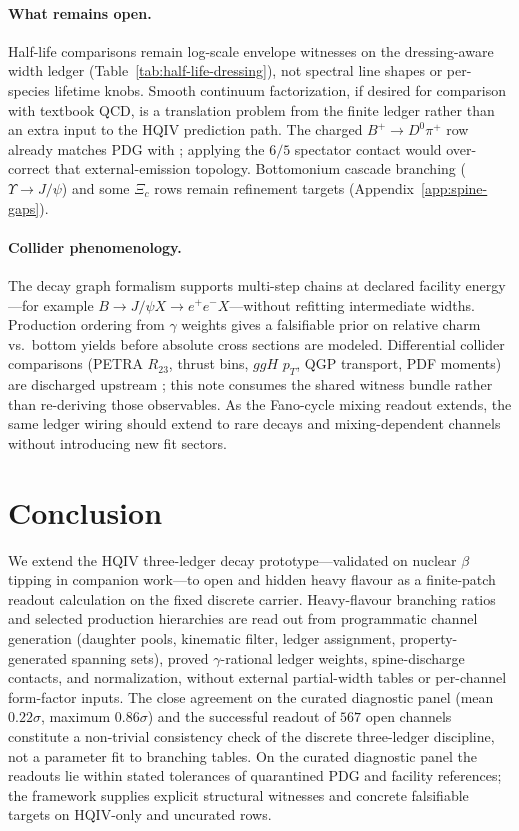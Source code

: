 \documentclass[11pt]{amsart}
\newcommand{\leanid}[1]{{\footnotesize\path{#1}}}
\begin{document}
\paragraph{What remains open.}
Half-life comparisons remain log-scale envelope witnesses on the dressing-aware width
ledger (Table~\ref{tab:half-life-dressing}), not spectral line shapes or per-species
lifetime knobs.
Smooth continuum factorization, if desired for comparison with textbook QCD, is a
translation problem from the finite ledger rather than an extra input to the HQIV
prediction path.
The charged $B^+\to D^0\pi^+$ row already matches PDG with
\leanid{bottomExternalWeakContact}; applying the $6/5$ spectator contact would
over-correct that external-emission topology.
Bottomonium cascade branching ($\Upsilon\to J/\psi$) and some $\Xi_c$ rows
remain refinement targets (Appendix~\ref{app:spine-gaps}).

\paragraph{Collider phenomenology.}
The decay graph formalism supports multi-step chains at declared facility
energy---for example $B\to J/\psi X \to e^+e^- X$---without refitting intermediate
widths.
Production ordering from $\gamma$ weights gives a falsifiable prior on relative
charm vs.\ bottom yields before absolute cross sections are modeled.
Differential collider comparisons (PETRA $R_{23}$, thrust bins, $ggH$ $p_T$,
QGP transport, PDF moments) are discharged upstream
\cite{hqiv-gluon-curvature-note}; this note consumes the shared witness bundle
rather than re-deriving those observables.
As the Fano-cycle mixing readout extends, the same ledger wiring should extend
to rare decays and mixing-dependent channels without introducing new fit sectors.

\section{Conclusion}

We extend the HQIV three-ledger decay prototype---validated on nuclear
$\beta$ tipping in companion work---to open and hidden heavy flavour as a
finite-patch readout calculation on the fixed discrete carrier.
Heavy-flavour branching ratios and selected production hierarchies are read out from
programmatic channel generation (daughter pools, kinematic filter, ledger assignment,
property-generated spanning sets), proved $\gamma$-rational ledger weights,
spine-discharge contacts, and normalization, without external partial-width tables
or per-channel form-factor inputs.
The close agreement on the curated diagnostic panel (mean $0.22\sigma$,
maximum $0.86\sigma$) and the successful readout of $567$ open channels constitute
a non-trivial consistency check of the discrete three-ledger discipline, not a
parameter fit to branching tables.
On the curated diagnostic panel the readouts lie within stated tolerances of
quarantined PDG and facility references; the framework supplies explicit structural
witnesses and concrete falsifiable targets on HQIV-only and uncurated rows.
\end{document}
